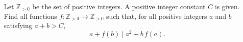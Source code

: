 Let $\mathbb{Z}_{>0}$ be the set of positive integers. A positive integer constant $C$ is given. Find all functions $f:\mathbb{Z}_{>0}\to\mathbb{Z}_{>0}$ such that, for all positive integers $a$ and $b$ satisfying $a+b>C$,
\[a+f(b)\mid a^2+b\,f(a).\]
